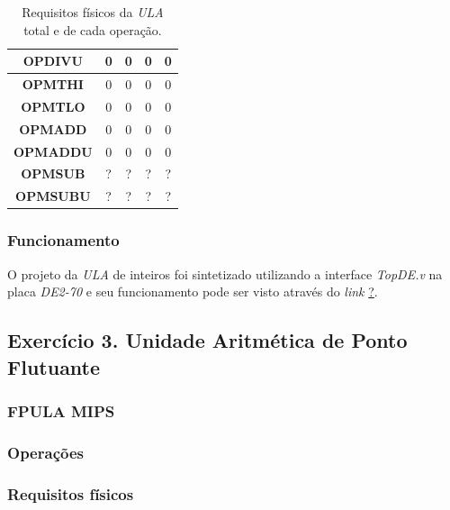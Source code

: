 \documentclass[12pt]{article}
\begin{document}
\begin{table}[H]
\begin{tabular}{|c|c|c|c|c|}
		\textbf{OPDIVU} & 0 & 0 & 0 & 0 \\\hline
		\textbf{OPMTHI} & 0 & 0 & 0 & 0 \\\hline
		\textbf{OPMTLO} & 0 & 0 & 0 & 0 \\\hline
		\textbf{OPMADD} & 0 & 0 & 0 & 0 \\\hline
		\textbf{OPMADDU} & 0 & 0 & 0 & 0 \\\hline
		\textbf{OPMSUB} & ? & ? & ? & ? \\\hline
		\textbf{OPMSUBU}  & ? & ? & ? & ? \\\hline
	\end{tabular}
	\caption{Requisitos físicos da \textit{ULA} total e de cada operação.}
	\label{tab:req2}
\end{table}

\subsubsection{Funcionamento}
\label{subsubsec:ulafunc}

O projeto da \textit{ULA} de inteiros foi sintetizado utilizando a interface \textit{TopDE.v} na placa \textit{DE2-70} e seu funcionamento pode ser visto através do \textit{link} \url{?}. 

\subsection{Exercício 3. Unidade Aritmética de Ponto Flutuante }
\label{subsec:ulafloat}

\subsubsection{FPULA MIPS}
\label{subsubsec:fpulamips}


\subsubsection{Operações}
\label{subsubsec:3op}


\subsubsection{Requisitos físicos}
\label{subsubsec:fpulafis}
\end{document}
